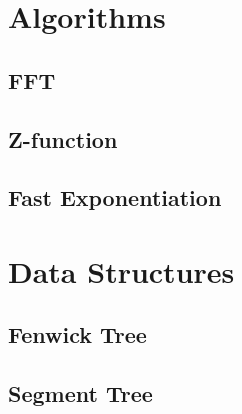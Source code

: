 \documentclass[12pt]{article}
\begin{document}
\tableofcontents

%
% 
%
% 

\section{Algorithms}

\subsection{FFT}


\subsection{Z-function}


\subsection{Fast Exponentiation}



\section{Data Structures}

\subsection{Fenwick Tree}


\subsection{Segment Tree}

\end{document}
